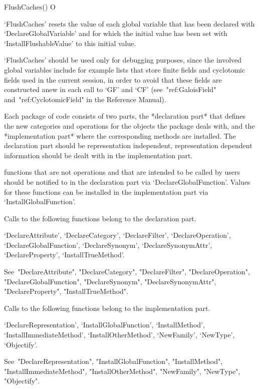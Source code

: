 \>FlushCaches() O

`FlushCaches' resets the value of each global variable that has
been declared with `DeclareGlobalVariable' and for which the initial
value has been set with `InstallFlushableValue' to this initial value.

`FlushCaches' should be used only for debugging purposes,
since the involved global variables include for example lists that store
finite fields and cyclotomic fields used in the current {\GAP} session,
in order to avoid that these fields are constructed anew in each call
to `GF' and `CF' (see~"ref:GaloisField" and~"ref:CyclotomicField"
in the Reference Manual).



Each package of {\GAP} code consists of two parts,
the *declaration part* that defines the new categories and operations for
the objects the package deals with,
and the *implementation part* where the corresponding methods are
installed.
The declaration part should be representation independent,
representation dependent information should be dealt with in the
implementation part.

{\GAP} functions that are not operations and that are intended to be
called by users should be notified to {\GAP} in the declaration part via
`DeclareGlobalFunction'.
Values for these functions can be installed in the implementation part
via `InstallGlobalFunction'.

Calls to the following functions belong to the declaration part.

`DeclareAttribute',
`DeclareCategory',
`DeclareFilter',
`DeclareOperation',
`DeclareGlobalFunction',
`DeclareSynonym',
`DeclareSynonymAttr',
`DeclareProperty',
`InstallTrueMethod'.

See~"DeclareAttribute",
"DeclareCategory",
"DeclareFilter",
"DeclareOperation",
"DeclareGlobalFunction",
"DeclareSynonym",
"DeclareSynonymAttr",
"DeclareProperty",
"InstallTrueMethod".

Calls to the following functions belong to the implementation part.

`DeclareRepresentation',
`InstallGlobalFunction',
`InstallMethod',
`InstallImmediateMethod',
`InstallOtherMethod',
`NewFamily',
`NewType',
`Objectify'.

See~"DeclareRepresentation",
"InstallGlobalFunction",
"InstallMethod",
"InstallImmediateMethod",
"InstallOtherMethod",
"NewFamily",
"NewType",
"Objectify".

